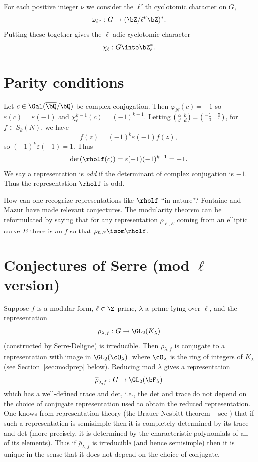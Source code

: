 \documentclass{report}
\begin{document}
For each positive integer $\nu$ we consider the $\ell^{\nu}$th
cyclotomic character on $G$,
\begin{equation*}
\varphi_{\ell^{\nu}}:G\rightarrow (\bZ/\ell^{\nu}\bZ)^*.
\end{equation*}
Putting these together gives the $\ell$-adic cyclotomic character
$$\chi_{\ell}:G\into\bZ_{\ell}^{*}.$$

\section{Parity conditions}

Let $c\in\Gal(\overline{\bQ}/\bQ)$ be complex conjugation.
Then $\varphi_N(c)=-1$ so $\varepsilon(c) = \varepsilon(-1)$ and
$\chi_{\ell}^{k-1}(c) = (-1)^{k-1}$.
Letting
$\bigl(\begin{smallmatrix} a&b\\c'&d\end{smallmatrix}\bigr)
=
\bigl(\begin{smallmatrix} -1&\hfill 0\\\hfill 0&-1\end{smallmatrix}\bigr)$,
for $f\in S_k(N)$, we have
$$f(z) = (-1)^k\varepsilon(-1)f(z),$$
so $(-1)^k\varepsilon(-1) = 1$.
Thus
$$\det(\rholf(c)) = \varepsilon(-1)(-1)^{k-1} = -1.$$
We say a representation is {\em odd} if the determinant of complex
conjugation is $-1$.  Thus the representation $\rholf$ is odd.

\begin{remark} How can one recognize representations
  like $\rholf$ ``in nature''? Fontaine and Mazur have
  made relevant conjectures.  The modularity theorem can be
  reformulated by saying that for any representation $\rho_{\ell,E}$
  coming from an elliptic curve $E$ there is an $f$ so that
  $\rho_{\ell,E}\isom \rholf$.
\end{remark}

\section{Conjectures of Serre (mod $\ell$ version)}
Suppose $f$ is a modular form, $\ell\in\Z$  prime,
$\lambda$ a prime lying over $\ell$, and the representation
$$\rho_{\lambda,f}:G\rightarrow \GL_2(K_{\lambda})$$
(constructed by Serre-Deligne) is irreducible.
Then $\rho_{\lambda,f}$ is conjugate to a representation
with image in $\GL_2(\cO_{\lambda})$, where $\cO_{\lambda}$
is the ring of integers of $K_{\lambda}$ (see Section~\ref{sec:modprep} below).
Reducing mod $\lambda$ gives a representation
$$\overline{\rho}_{\lambda,f}:G\rightarrow\GL_2(\bF_{\lambda})$$
which has a well-defined trace and det, i.e., the det and trace do not
depend on the choice of conjugate representation used to obtain the
reduced representation.  One knows from representation theory (the
Brauer-Nesbitt theorem -- see \cite{curtis-reiner}) that if such a
representation is semisimple then it is completely determined by its
trace and det (more precisely, it is determined by the characteristic
polynomials of all of its elements).  Thus if
$\overline{\rho}_{\lambda,f}$ is irreducible (and hence semisimple)
then it is unique in the sense that it does not depend on the choice
of conjugate.
\end{document}
